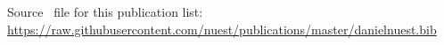 \documentclass{article}
\begin{document}
%
%
%
%
%
%

\vfill
Source \BibTeX \ file for this publication list: \url{https://raw.githubusercontent.com/nuest/publications/master/danielnuest.bib}
\clearpage
\end{document}
